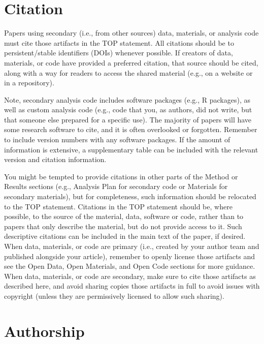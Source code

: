\documentclass[
  oneside]{book}
\begin{document}
\hypertarget{authors-citation}{%
\chapter{Citation}\label{authors-citation}}

Papers using secondary (i.e., from other sources) data, materials, or analysis code must cite those artifacts in the TOP statement. All citations should be to persistent/stable identifiers (DOIs) whenever possible. If creators of data, materials, or code have provided a preferred citation, that source should be cited, along with a way for readers to access the shared material (e.g., on a website or in a repository).

Note, secondary analysis code includes software packages (e.g., R packages), as well as custom analysis code (e.g., code that you, as authors, did not write, but that someone else prepared for a specific use). The majority of papers will have some research software to cite, and it is often overlooked or forgotten. Remember to include version numbers with any software packages. If the amount of information is extensive, a supplementary table can be included with the relevant version and citation information.

You might be tempted to provide citations in other parts of the Method or Results sections (e.g., Analysis Plan for secondary code or Materials for secondary materials), but for completeness, such information should be relocated to the TOP statement. Citations in the TOP statement should be, where possible, to the source of the material, data, software or code, rather than to papers that only describe the material, but do not provide access to it. Such descriptive citations can be included in the main text of the paper, if desired.
When data, materials, or code are primary (i.e., created by your author team and published alongside your article), remember to openly license those artifacts and see the Open Data, Open Materials, and Open Code sections for more guidance. When data, materials, or code are secondary, make sure to cite those artifacts as described here, and avoid sharing copies those artifacts in full to avoid issues with copyright (unless they are permissively licensed to allow such sharing).

\hypertarget{authors-authorship}{%
\chapter{Authorship}\label{authors-authorship}}
\end{document}
